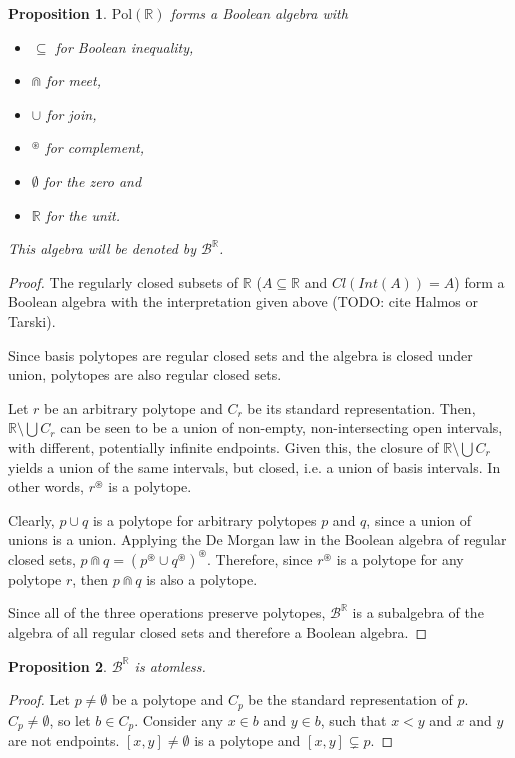 \documentclass{article}
\newtheorem*{proposition}{Proposition}
\newcommand{\R}{\mathbb{R}}
\newcommand{\B}{\mathcal{B}}
\newcommand{\bcup}{\cup}
\newcommand{\bcap}{\Cap}
\newcommand{\bstar}{^\circledast}
\newcommand{\Pol}{\text{Pol}}
\begin{document}
\begin{proposition}
$\Pol(\R)$ forms a Boolean algebra with
  \begin{itemize}
  \item $\subseteq$ for Boolean inequality,
  \item $\bcap$ for meet,
  \item $\bcup$ for join,
  \item $\bstar$ for complement,
  \item $\emptyset$ for the zero and
  \item $\R$ for the unit.
\end{itemize}
This algebra will be denoted by $\B^\R$.
\end{proposition}
\begin{proof}
  The regularly closed subsets of $\R$ ($A \subseteq \R$ and $Cl(Int(A)) = A$) form a Boolean algebra with the interpretation given above (TODO: cite Halmos or Tarski).

  Since basis polytopes are regular closed sets and the algebra is closed under union, polytopes are also regular closed sets.

  Let $r$ be an arbitrary polytope and $C_r$ be its standard representation. Then, $\R \setminus \bigcup C_r$ can be seen to be a union of non-empty, non-intersecting open intervals, with different, potentially infinite endpoints. Given this, the closure of $\R \setminus \bigcup C_r$ yields a union of the same intervals, but closed, i.e. a union of basis intervals. In other words, $r\bstar$ is a polytope.

  Clearly, $p \cup q$ is a polytope for arbitrary polytopes $p$ and $q$, since a union of unions is a union. Applying the De Morgan law in the Boolean algebra of regular closed sets, $p \bcap q = (p\bstar \cup q\bstar)\bstar$. Therefore, since $r\bstar$ is a polytope for any polytope $r$, then $p \bcap q$ is also a polytope.

  Since all of the three operations preserve polytopes, $\B^\R$ is a subalgebra of the algebra of all regular closed sets and therefore a Boolean algebra.
\end{proof}

\begin{proposition}
  $\B^\R$ is atomless.
\end{proposition}
\begin{proof}
  Let $p \neq \emptyset$ be a polytope and $C_p$ be the standard representation of $p$. $C_p \neq \emptyset$, so let $b \in C_p$. Consider any $x \in b$ and $y \in b$, such that $x < y$ and $x$ and $y$ are not endpoints. $[x, y] \neq \emptyset$ is a polytope and $[x, y] \subsetneq p$.
\end{proof}
\end{document}

